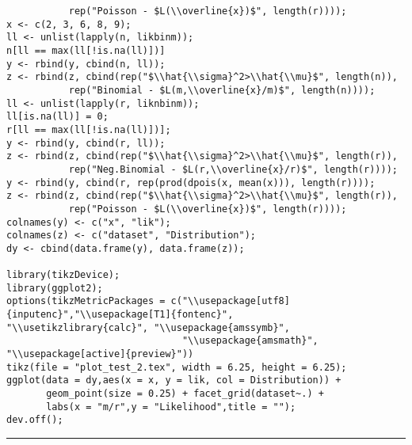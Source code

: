 \documentclass[]{book}
\theoremstyle{definition}
\theoremstyle{definition}
\theoremstyle{definition}
\theoremstyle{remark}
\begin{document}
\begin{verbatim}
           rep("Poisson - $L(\\overline{x})$", length(r))));
x <- c(2, 3, 6, 8, 9);
ll <- unlist(lapply(n, likbinm));
n[ll == max(ll[!is.na(ll)])]
y <- rbind(y, cbind(n, ll));
z <- rbind(z, cbind(rep("$\\hat{\\sigma}^2>\\hat{\\mu}$", length(n)), 
           rep("Binomial - $L(m,\\overline{x}/m)$", length(n))));
ll <- unlist(lapply(r, liknbinm));
ll[is.na(ll)] = 0;
r[ll == max(ll[!is.na(ll)])];
y <- rbind(y, cbind(r, ll));
z <- rbind(z, cbind(rep("$\\hat{\\sigma}^2>\\hat{\\mu}$", length(r)), 
           rep("Neg.Binomial - $L(r,\\overline{x}/r)$", length(r))));
y <- rbind(y, cbind(r, rep(prod(dpois(x, mean(x))), length(r))));
z <- rbind(z, cbind(rep("$\\hat{\\sigma}^2>\\hat{\\mu}$", length(r)), 
           rep("Poisson - $L(\\overline{x})$", length(r))));
colnames(y) <- c("x", "lik");
colnames(z) <- c("dataset", "Distribution");
dy <- cbind(data.frame(y), data.frame(z));

library(tikzDevice);
library(ggplot2);
options(tikzMetricPackages = c("\\usepackage[utf8]{inputenc}","\\usepackage[T1]{fontenc}",                                "\\usetikzlibrary{calc}", "\\usepackage{amssymb}",
                               "\\usepackage{amsmath}", "\\usepackage[active]{preview}"))
tikz(file = "plot_test_2.tex", width = 6.25, height = 6.25);
ggplot(data = dy,aes(x = x, y = lik, col = Distribution)) + 
       geom_point(size = 0.25) + facet_grid(dataset~.) + 
       labs(x = "m/r",y = "Likelihood",title = ""); 
dev.off();
\end{verbatim}

\begin{center}\rule{0.5\linewidth}{\linethickness}\end{center}
\end{document}
